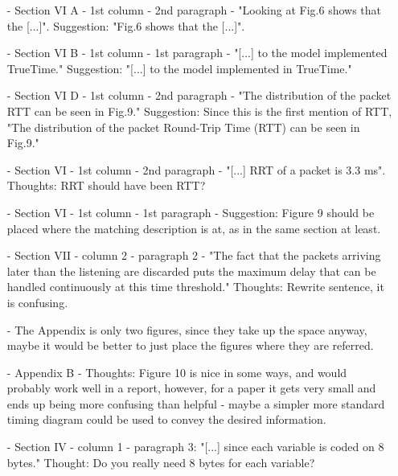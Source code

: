 \begin{itemize}
\item[-]Section VI A - 1st column - 2nd paragraph - "Looking at Fig.6 shows that the [...]".
Suggestion: "Fig.6 shows that the [...]".\\
\item[-]Section VI B - 1st column - 1st paragraph - "[...] to the model implemented TrueTime."
Suggestion: "[...] to the model implemented in TrueTime."\\
\item[-]Section VI D - 1st column - 2nd paragraph - "The distribution of the packet RTT can be seen in Fig.9."
Suggestion: Since this is the first mention of RTT, "The distribution of the packet Round-Trip Time (RTT) can be seen in Fig.9."\\
\item[-]Section VI - 1st column - 2nd paragraph - "[...] RRT of a packet is 3.3 ms".
Thoughts: RRT should have been RTT?\\
\item[-]Section VI - 1st column - 1st paragraph - 
Suggestion: Figure 9 should be placed where the matching description is at, as in the same section at least.\\
\item[-]
Section VII - column 2 - paragraph 2 - "The fact that the packets arriving later than the listening are discarded puts the maximum delay that can be handled continuously at this time threshold."
Thoughts: Rewrite sentence, it is confusing.\\
\item[-]The Appendix is only two figures, since they take up the space anyway, maybe it would be better to just place the figures where they are referred.\\
\item[-] Appendix B -
Thoughts: Figure 10 is nice in some ways, and would probably work well in a report, however, for a paper it gets very small and ends up being more confusing than helpful - maybe a simpler more standard timing diagram could be used to convey the desired information.\\
\item[-]Section IV - column 1 - paragraph 3: "[...] since each variable is coded on 8 bytes."
Thought: Do you really need 8 bytes for each variable?						
\end{itemize}
